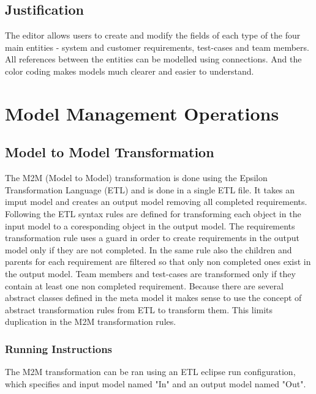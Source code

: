 \documentclass[11pt,a4paper]{article}
\begin{document}
	
	\subsection{Justification}
	The editor allows users to create and modify the fields of each type of the four main entities - system and customer requirements, test-cases and team members. All references between the entities can be modelled using connections. And the color coding makes models much clearer and easier to understand.



	\section{Model Management Operations}
	
	\subsection{Model to Model Transformation}
	The M2M (Model to Model) transformation is done using the Epsilon Transformation Language (ETL) \cite{etl} and is done in a single ETL file. It takes an imput model and creates an output model removing all completed requirements. Following the ETL syntax rules are defined for transforming each object in the input model to a coresponding object in the output model. The requirements transformation rule uses a guard in order to create requirements in the output model only if they are not completed. In the same rule also the children and parents for each requirement are filtered so that only non completed ones exist in the output model. Team members and test-cases are transformed only if they contain at least one non completed requirement. Because there are several abstract classes defined in the meta model it makes sense to use the concept of abstract transformation rules from ETL to transform them. This limits duplication in the M2M transformation rules.
	
	\subsubsection{Running Instructions}
	The M2M transformation can be ran using an ETL eclipse run configuration, which specifies and input model named "In" and an output model named "Out".
	
\end{document}
